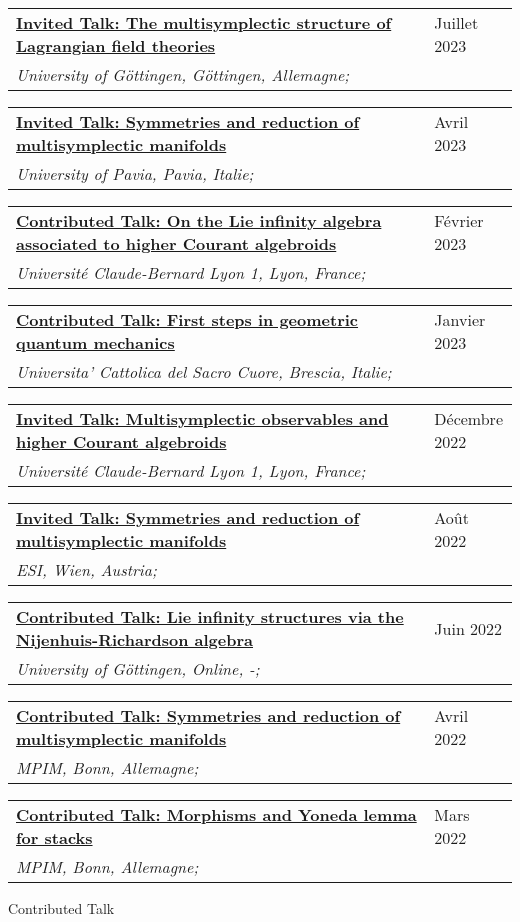\documentclass[a4paper]{article}
\newcommand{\longvoice}[8]{
    \begin{tabular}{p{0.83\linewidth} p{0.17\linewidth} }
        \textbf{\href{#3}{#2: #1}} & #4 
        \\ 
        \textit{#5, #6, #7;} & {\small\emph{#8}}
    \end{tabular}
    \vspace{.5em}
    }
\begin{document}
    \longvoice{The multisymplectic structure of Lagrangian field theories}
        {Invited Talk}
        {https://www.dropbox.com/s/lsaqjhq6g0rmagw/2307-Gottingen-MsLFT.pdf?dl=0}
        {Juillet 2023}
        {University of Göttingen}
        {Göttingen}
        {Allemagne}
        {}
    \longvoice{Symmetries and reduction of multisymplectic manifolds}
        {Invited Talk}
        {https://mathematicalphysicspavia.wordpress.com/2023/04/04/antonio-michele-miti-28-04-2023-symmetries-and-reduction-of-multisymplectic-manifoldsantonio-michele-miti/}
        {Avril 2023}
        {University of Pavia}
        {Pavia}
        {Italie}
        {}
    \longvoice{On the Lie infinity algebra associated to higher Courant algebroids}
        {Contributed Talk}
        {https://www.dropbox.com/s/whusmg6kj8dbqd7/2302-Lyon-HigherGeoWorkgroup.pdf?dl=0}
        {Février 2023}
        {Université Claude-Bernard Lyon 1}
        {Lyon}
        {France}
        {}
    \longvoice{First steps in geometric quantum mechanics}
        {Contributed Talk}
        {https://www.dropbox.com/s/oqd6psmeiexwhnt/2301-Brescia-PhdSeminar.pdf?dl=0}
        {Janvier 2023}
        {Universita' Cattolica del Sacro Cuore}
        {Brescia}
        {Italie}
        {}
    \longvoice{Multisymplectic observables and higher Courant algebroids}
        {Invited Talk}
        {https://indico.math.cnrs.fr/event/8621/}
        {Décembre 2022}
        {Université Claude-Bernard Lyon 1}
        {Lyon}
        {France}
        {}
    \longvoice{Symmetries and reduction of multisymplectic manifolds}
        {Invited Talk}
        {https://www.esi.ac.at/events/t1028/}
        {Août 2022}
        {ESI}
        {Wien}
        {Austria}
        {}
    \longvoice{Lie infinity structures via the Nijenhuis-Richardson algebra}
        {Contributed Talk}
        {https://www.dropbox.com/s/lq862vynwme0eyn/2206-Online-GoodMorningSfars.pdf?dl=0}
        {Juin 2022}
        {University of Göttingen}
        {Online}
        {-}
        {}
    \longvoice{Symmetries and reduction of multisymplectic manifolds}
        {Contributed Talk}
        {https://www.mpim-bonn.mpg.de/node/11285}
        {Avril 2022}
        {MPIM}
        {Bonn}
        {Allemagne}
        {}
    \longvoice{Morphisms and Yoneda lemma for stacks}
        {Contributed Talk}
        {https://www.dropbox.com/s/rfu7cw1plq0wpzb/2203-Bonn-StackMorphisms.pdf?dl=0}
        {Mars 2022}
        {MPIM}
        {Bonn}
        {Allemagne}
        {}
        {Contributed Talk}
\end{document}
